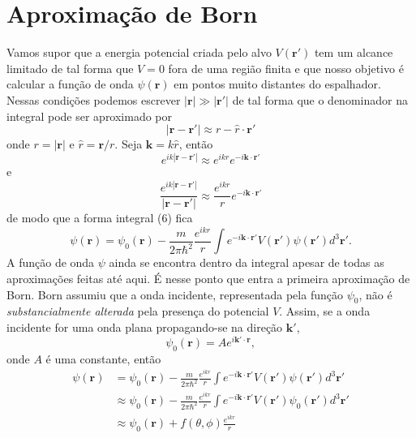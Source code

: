 \documentclass{article}
\begin{document}
\section{Aproximação de Born}

Vamos supor que a energia potencial criada pelo alvo $V(\mathbf{r}')$ tem um alcance limitado de tal forma que $V = 0$ fora de uma região finita e que nosso objetivo é calcular a função de onda $\psi(\mathbf{r})$ em pontos muito distantes do espalhador. Nessas condições podemos escrever $|\mathbf{r}| \gg |\mathbf{r}'|$ de tal forma que o denominador na integral pode ser aproximado por
\begin{equation}
    |\mathbf{r}-\mathbf{r}'| \approx r - \hat{r}\cdot\mathbf{r}'
\end{equation}
onde $r = |\mathbf{r}|$ e $\hat{r} = \mathbf{r}/r$. Seja  $\mathbf{k} = k\hat{r}$, então
\begin{equation}
    e^{ik|\mathbf{r}-\mathbf{r}'|} \approx e^{ikr}e^{-i\mathbf{k}\cdot\mathbf{r}'}
\end{equation}
e
\begin{equation}
    \frac{e^{ik|\mathbf{r}-\mathbf{r}'|}}{|\mathbf{r}-\mathbf{r}'|} \approx \frac{e^{ikr}}{r}e^{-i\mathbf{k}\cdot\mathbf{r}'}
\end{equation}
de modo que a forma integral (6) fica
\begin{equation}
    \psi(\mathbf{r}) = \psi_0 (\mathbf{r}) - \frac{m}{2\pi\hbar^2}\frac{e^{ikr}}{r}\int e^{-i\mathbf{k}\cdot\mathbf{r}'} V(\mathbf{r}')\psi(\mathbf{r}')d^{3}\mathbf{r}'   . 
\end{equation}
A função de onda $\psi$ ainda se encontra dentro da integral apesar de todas as aproximações feitas até aqui. É nesse ponto que entra a primeira aproximação de Born. Born assumiu que a onda incidente, representada pela função $\psi_0$, não é \textit{substancialmente alterada} pela presença do potencial $V$. Assim, se a onda incidente for uma onda plana propagando-se na direção $\mathbf{k}'$, 
\begin{equation}
    \psi_0(\mathbf{r}) = Ae^{i\mathbf{k}'\cdot\mathbf{r}},
\end{equation}
onde $A$ é uma constante, então
\begin{equation}
\begin{split}
\psi(\mathbf{r}) &= \psi_0 (\mathbf{r}) - \frac{m}{2\pi\hbar^2}\frac{e^{ikr}}{r}\int e^{-i\mathbf{k}\cdot\mathbf{r}'} V(\mathbf{r}')\psi(\mathbf{r}')d^{3}\mathbf{r}' \\
                 &\approx \psi_0 (\mathbf{r}) - \frac{m}{2\pi\hbar^2}\frac{e^{ikr}}{r}\int e^{-i\mathbf{k}\cdot\mathbf{r}'} V(\mathbf{r}')\psi_0(\mathbf{r}')d^{3}\mathbf{r}' \\
                 &\approx \psi_0(\mathbf{r})+f(\theta,\phi)\frac{e^{ikr}}{r}
\end{split}
\end{equation}
\end{document}
